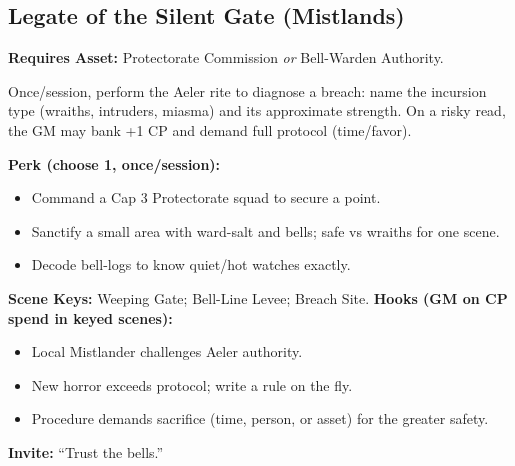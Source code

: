 \subsection{Legate of the Silent Gate (Mistlands)}
\textbf{Requires Asset:} Protectorate Commission \emph{or} Bell-Warden Authority.
\begin{tcolorbox}[enhanced,sharp corners,boxrule=.6pt,title={Talent — Breath-Test (8 XP)}]
Once/session, perform the Aeler rite to diagnose a breach: name the incursion type (wraiths, intruders, miasma) and its approximate strength. On a risky read, the GM may bank +1 CP and demand full protocol (time/favor).
\end{tcolorbox}
\textbf{Perk (choose 1, once/session):}
\begin{itemize}
  \item Command a Cap 3 Protectorate squad to secure a point.
  \item Sanctify a small area with ward-salt and bells; safe vs wraiths for one scene.
  \item Decode bell-logs to know quiet/hot watches exactly.
\end{itemize}
\textbf{Scene Keys:} Weeping Gate; Bell-Line Levee; Breach Site.
\textbf{Hooks (GM on CP spend in keyed scenes):}
\begin{itemize}
  \item Local Mistlander challenges Aeler authority.
  \item New horror exceeds protocol; write a rule on the fly.
  \item Procedure demands sacrifice (time, person, or asset) for the greater safety.
\end{itemize}
\textbf{Invite:} “Trust the bells.”
